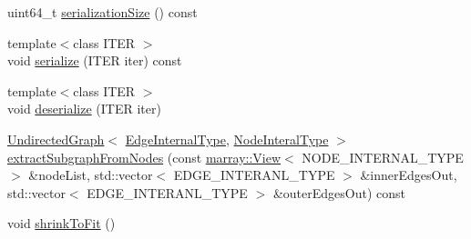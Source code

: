 \begin{DoxyCompactItemize}
\item 
uint64\+\_\+t \hyperlink{classnifty_1_1graph_1_1UndirectedGraph_ae1dde74a0b401367dd42bff541b9fcd1}{serialization\+Size} () const
\item 
{\footnotesize template$<$class I\+T\+ER $>$ }\\void \hyperlink{classnifty_1_1graph_1_1UndirectedGraph_a482c06ee7f8b1acd32897c45a4de436e}{serialize} (I\+T\+ER iter) const
\item 
{\footnotesize template$<$class I\+T\+ER $>$ }\\void \hyperlink{classnifty_1_1graph_1_1UndirectedGraph_ad64103a26a487c730d69e7daaef38191}{deserialize} (I\+T\+ER iter)
\item 
\hyperlink{classnifty_1_1graph_1_1UndirectedGraph}{Undirected\+Graph}$<$ \hyperlink{classnifty_1_1graph_1_1UndirectedGraph_a70e38582c25deca5e0ce080277cb30fc}{Edge\+Internal\+Type}, \hyperlink{classnifty_1_1graph_1_1UndirectedGraph_aa3b43dd44281416b7232caae529e8780}{Node\+Interal\+Type} $>$ \hyperlink{classnifty_1_1graph_1_1UndirectedGraph_aceb04e9a0aacfd415c87c1c70ab89612}{extract\+Subgraph\+From\+Nodes} (const \hyperlink{classandres_1_1View}{marray\+::\+View}$<$ N\+O\+D\+E\+\_\+\+I\+N\+T\+E\+R\+N\+A\+L\+\_\+\+T\+Y\+PE $>$ \&node\+List, std\+::vector$<$ E\+D\+G\+E\+\_\+\+I\+N\+T\+E\+R\+A\+N\+L\+\_\+\+T\+Y\+PE $>$ \&inner\+Edges\+Out, std\+::vector$<$ E\+D\+G\+E\+\_\+\+I\+N\+T\+E\+R\+A\+N\+L\+\_\+\+T\+Y\+PE $>$ \&outer\+Edges\+Out) const
\item 
void \hyperlink{classnifty_1_1graph_1_1UndirectedGraph_a4d1abbc35f94744412a9f6474d922e59}{shrink\+To\+Fit} ()
\end{DoxyCompactItemize}
